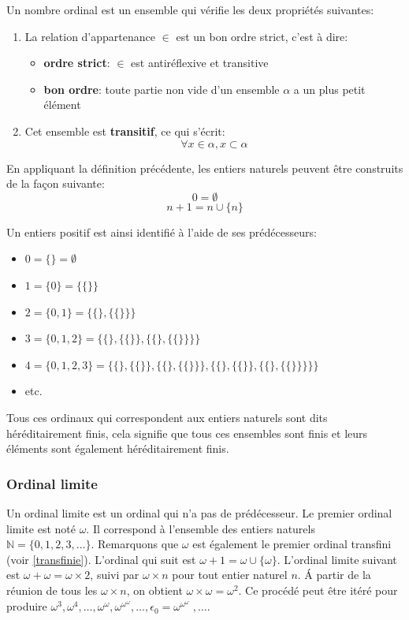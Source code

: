 \documentclass[a4paper, 11pt]{article}
\begin{document}
Un nombre ordinal est un ensemble qui vérifie les deux propriétés suivantes:
\begin{enumerate}
    \item La relation d'appartenance $\in$ est un bon ordre strict, c'est à dire:
    \begin{itemize}
        \item \textbf{ordre strict}: $\in$ est antiréflexive et transitive
        \item \textbf{bon ordre}: toute partie non vide d'un ensemble $\alpha$ a un plus petit élément
    \end{itemize}

    \item Cet ensemble est \textbf{transitif}, ce qui s'écrit:
    \[\forall x \in \alpha, x \subset \alpha\]
\end{enumerate}

En appliquant la définition précédente, les entiers naturels peuvent être construits
de la façon suivante:
\[0 = \emptyset\]
\[n + 1 = n \cup \{n\}\]

Un entiers positif est ainsi identifié à l'aide de ses prédécesseurs:
\begin{itemize}
    \item $0 = \{\} = \emptyset$
    \item $1 = \{0\} = \{\{\}\}$
    \item $2 = \{0, 1\} = \{\{\}, \{\{\}\}\}$
    \item $3 = \{0, 1, 2\} = \{\{\}, \{\{\}\}, \{\{\}, \{\{\}\}\}\}$
    \item $4 = \{0, 1, 2, 3\} = \{\{\}, \{\{\}\}, \{\{\}, \{\{\}\}\}, \{\{\}, \{\{\}\}, \{\{\}, \{\{\}\}\}\}\}$
    \item etc.
\end{itemize}

Tous ces ordinaux qui correspondent aux entiers naturels sont dits héréditairement finis,
cela signifie que tous ces
ensembles sont finis et leurs éléments sont également héréditairement finis.

\subsubsection{Ordinal limite}

Un ordinal limite est un ordinal qui n'a pas de prédécesseur.
Le premier ordinal limite est noté $\omega$.
Il correspond à l'ensemble des entiers naturels $\mathbb N = \{0, 1, 2, 3, \dots\}$.
Remarquons que $\omega$ est également
le premier ordinal transfini (voir \ref{transfinie}).
L'ordinal qui suit est $\omega + 1 = \omega \cup \{\omega\}$. L'ordinal limite suivant
est $\omega + \omega = \omega \times 2$, suivi par $\omega \times n$ pour tout entier naturel $n$.
\'{A} partir de la réunion de tous les $\omega \times n$, on obtient $\omega \times \omega = \omega^2$.
Ce procédé peut être itéré pour produire 
$\omega^3, \omega^4, \dots, \omega^\omega, \omega^{\omega^\omega}, \dots, 
\epsilon_0 = \omega^{\omega^{\omega^{.^{.^{.}}}}}, \dots$.
\end{document}
